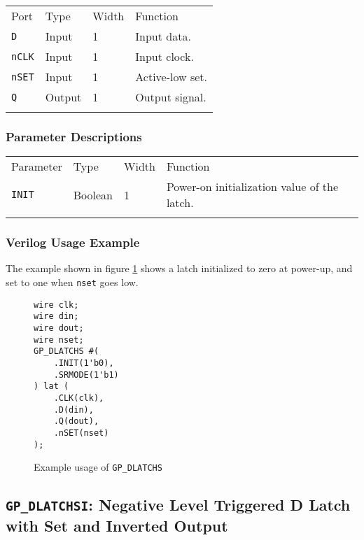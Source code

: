\documentclass[11pt]{article}
\newcommand{\tokenstyle}[1]{\texttt{#1}}
\newcommand{\wirestyle}[1]{\texttt{#1}}
\newcommand{\whenstyle}[1]{{\fontseries{sb}\selectfont#1}}
\newcommand{\thinhline}{\Xhline{1\arrayrulewidth}}
\newcommand{\thickhline}{\Xhline{2.5\arrayrulewidth}}
\begin{document}
\begin{tabularx}{\textwidth}{lllX}
\thinhline
\whenstyle{Port} & \whenstyle{Type} & \whenstyle{Width} & \whenstyle{Function} \\
\thickhline
\tokenstyle{D} & Input & 1 & Input data. \\
\thinhline
\tokenstyle{nCLK} & Input & 1 & Input clock. \\
\thinhline
\tokenstyle{nSET} & Input & 1 & Active-low set. \\
\thinhline
\tokenstyle{Q} & Output & 1 & Output signal. \\
\thinhline
\end{tabularx}

\subsubsection{Parameter Descriptions}

\begin{tabularx}{\textwidth}{lllX}
\thinhline
\whenstyle{Parameter} & \whenstyle{Type} & \whenstyle{Width} & \whenstyle{Function} \\
\thickhline
\tokenstyle{INIT} & Boolean & 1 & Power-on initialization value of the latch.\\
\thinhline
\end{tabularx}

\subsubsection{Verilog Usage Example}

The example shown in figure \ref{gp-dlatchs-example} shows a latch initialized to zero at power-up, and set to one
when \wirestyle{nset} goes low.

\begin{figure}[h]
\begin{lstlisting}
wire clk;
wire din;
wire dout;
wire nset;
GP_DLATCHS #(
	.INIT(1'b0),
	.SRMODE(1'b1)
) lat (
	.CLK(clk),
	.D(din),
	.Q(dout),
	.nSET(nset)
);
\end{lstlisting}
\caption{Example usage of \tokenstyle{GP\_DLATCHS}}
\label{gp-dlatchs-example}
\end{figure}


\pagebreak
\subsection{\tokenstyle{GP\_DLATCHSI}: Negative Level Triggered D Latch with Set and Inverted Output}
\label{gp-latchsi}
\end{document}
